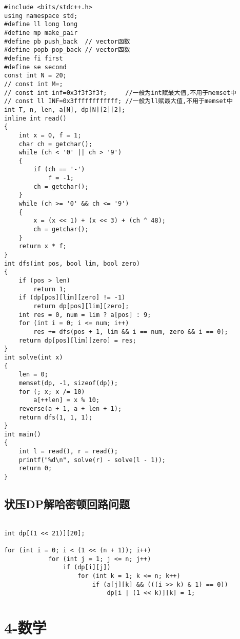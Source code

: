 \documentclass[]{article}
\begin{document}
\begin{verbatim}
#include <bits/stdc++.h>
using namespace std;
#define ll long long
#define mp make_pair
#define pb push_back  // vector函数
#define popb pop_back // vector函数
#define fi first
#define se second
const int N = 20;
// const int M=;
// const int inf=0x3f3f3f3f;     //一般为int赋最大值,不用于memset中
// const ll INF=0x3ffffffffffff; //一般为ll赋最大值,不用于memset中
int T, n, len, a[N], dp[N][2][2];
inline int read()
{
    int x = 0, f = 1;
    char ch = getchar();
    while (ch < '0' || ch > '9')
    {
        if (ch == '-')
            f = -1;
        ch = getchar();
    }
    while (ch >= '0' && ch <= '9')
    {
        x = (x << 1) + (x << 3) + (ch ^ 48);
        ch = getchar();
    }
    return x * f;
}
int dfs(int pos, bool lim, bool zero)
{
    if (pos > len)
        return 1;
    if (dp[pos][lim][zero] != -1)
        return dp[pos][lim][zero];
    int res = 0, num = lim ? a[pos] : 9;
    for (int i = 0; i <= num; i++)
        res += dfs(pos + 1, lim && i == num, zero && i == 0);
    return dp[pos][lim][zero] = res;
}
int solve(int x)
{
    len = 0;
    memset(dp, -1, sizeof(dp));
    for (; x; x /= 10)
        a[++len] = x % 10;
    reverse(a + 1, a + len + 1);
    return dfs(1, 1, 1);
}
int main()
{
    int l = read(), r = read();
    printf("%d\n", solve(r) - solve(l - 1));
    return 0;
}
\end{verbatim}

\hypertarget{ux72b6ux538bdpux89e3ux54c8ux5bc6ux987fux56deux8defux95eeux9898}{%
\subsection{状压DP解哈密顿回路问题}\label{ux72b6ux538bdpux89e3ux54c8ux5bc6ux987fux56deux8defux95eeux9898}}

\begin{verbatim}

int dp[(1 << 21)][20];

for (int i = 0; i < (1 << (n + 1)); i++)
            for (int j = 1; j <= n; j++)
                if (dp[i][j])
                    for (int k = 1; k <= n; k++)
                        if (a[j][k] && (((i >> k) & 1) == 0))
                            dp[i | (1 << k)][k] = 1;

\end{verbatim}

\hypertarget{ux6570ux5b66}{%
\section{4-数学}\label{ux6570ux5b66}}
\end{document}
